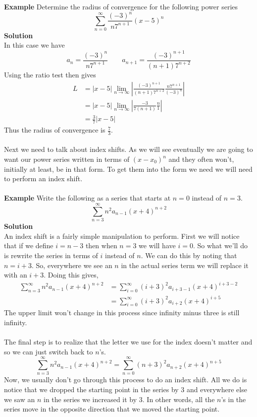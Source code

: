 \documentclass[10pt,reqno]{book}
\theoremstyle{definition}
\begin{document}
	\noindent \textbf{Example} Determine the radius of convergence for the following power series
	\[ \sum_{n = 0}^{\infty} \frac{(-3)^n}{n 7^{n+1}}(x-5)^n \]
	\textbf{Solution}\\
	In this case we have
	\[ a_n =  \frac{(-3)^n}{n 7^{n+1}} \qquad a_{n+1} = \frac{(-3)^{n+1}}{(n+1)7^{n+2}} \]
	Using the ratio test then gives
	\begin{align*}
	L &= |x-5|\lim_{n\to\infty} \left| \frac{(-3)^{n+1}}{(n+1)7^{n+2}} \frac{n 7^{n+1}}{(-3)^n} \right|\\
	&=|x-5| \lim_{n\to\infty} \left| \frac{-3}{7(n+1)} \frac{n}{1} \right|\\
	&= \frac{3}{7}|x-5|
	\end{align*}
	Thus the radius of convergence is $ \displaystyle{\frac{7}{3}} $.\\ \\
	Next we need to talk about index shifts.  As we will see eventually we are going to want our power series written in terms of $ (x-x_0)^n $ and they often won't, initially at least, be in that form. To get them into the form we need we will need to perform an index shift.\\ \\
	\textbf{Example } Write the following as a series that starts at $ n = 0 $ instead of $ n = 3 $.
	\[ \sum_{n = 3}^{\infty} n^2 a_{n-1}(x+4)^{n+2} \]
	\textbf{Solution}\\
	An index shift is a fairly simple manipulation to perform. First we will notice that if we define $ i=n-3 $ then when $ n = 3 $ we will have $ i = 0 $. So what we'll do is rewrite the series in terms of $ i $ instead of $ n $. We can do this by noting that $ n=i+3 $. So, everywhere we see an $ n $ in the actual series term we will replace it with an $ i + 3 $. Doing this gives,
	\begin{align*}
	\sum_{n = 3}^{\infty} n^2 a_{n-1} (x+4)^{n+2} &= \sum_{i = 0}^{\infty} (i+3)^2 a_{i + 3 - 1} (x+4)^{i + 3 - 2}\\
	&= \sum_{i = 0}^{\infty} (i+3)^2 a_{i+2} (x+4)^{i+5}
	\end{align*}
	The upper limit won't change in this process since infinity minus three is still infinity.\\ \\
	The final step is to realize that the letter we use for the index doesn't matter and so we can just switch back to $ n $'s.
	\[ \sum_{n = 3}^{\infty} n^2 a_{n-1} (x+4)^{n+2} = \sum_{n = 0}^{\infty} (n+3)^2 a_{n+2} (x+4)^{n+5} \]
	Now, we usually don't go through this process to do an index shift. All we do is notice that we dropped the starting point in the series by 3 and everywhere else we saw an $ n $ in the series we increased it by 3. In other words, all the $ n $'s in the series move in the opposite direction that we moved the starting point.
	
\end{document}
